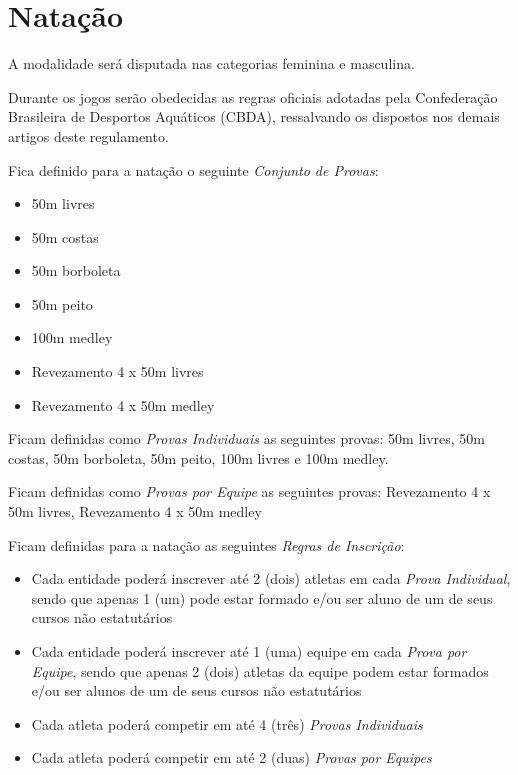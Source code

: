 {\let\clearpage\relax \chapter{Natação}}

\begin{article}
	A modalidade será disputada nas categorias feminina e masculina.
\end{article}

\begin{article}
	Durante os jogos serão obedecidas as regras oficiais adotadas pela Confederação Brasileira de Desportos Aquáticos (CBDA), ressalvando os dispostos nos demais artigos deste regulamento.

	Fica definido para a natação o seguinte \textit{Conjunto de Provas}:
	\begin{itemize}[noitemsep]
		\item 50m livres
		\item 50m costas
		\item 50m borboleta
		\item 50m peito
		\item 100m medley
		\item Revezamento 4 x 50m livres
		\item Revezamento 4 x 50m medley
	\end{itemize}

	\begin{xparagraph}
		Ficam definidas como \textit{Provas Individuais} as seguintes provas: 50m livres, 50m costas, 50m borboleta, 50m peito, 100m livres e 100m medley.
	\end{xparagraph}

	\begin{xparagraph}
		Ficam definidas como \textit{Provas por Equipe} as seguintes provas: Revezamento 4 x 50m livres, Revezamento 4 x 50m medley
	\end{xparagraph}
\end{article}

\noindent
Ficam definidas para a natação as seguintes \textit{Regras de Inscrição}:
\begin{itemize}[noitemsep]
	\item Cada entidade poderá inscrever até 2 (dois) atletas em cada \textit{Prova Individual}, sendo que apenas 1 (um) pode estar formado e/ou ser aluno de um de seus cursos não estatutários
	\item Cada entidade poderá inscrever até 1 (uma) equipe em cada \textit{Prova por Equipe}, sendo que apenas 2 (dois) atletas da equipe podem estar formados e/ou ser alunos de um de seus cursos não estatutários
	\item Cada atleta poderá competir em até 4 (três) \textit{Provas Individuais}
	\item Cada atleta poderá competir em até 2 (duas) \textit{Provas por Equipes}
\end{itemize}

